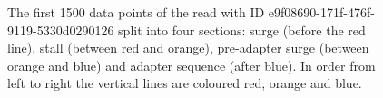 \begin{figure}
\centering

\caption{\label{fig:start-sections}The first 1500 data points of the read with ID e9f08690-171f-476f-9119-5330d0290126 split into four sections: surge (before the red line), stall (between red and orange), pre-adapter surge (between orange and blue) and adapter sequence (after blue). In order from left to right the vertical lines are coloured red, orange and blue.}
\end{figure}
